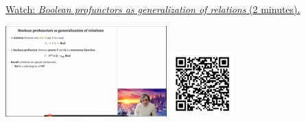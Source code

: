 
\begin{minipage}{10cm}
    \href{https://act4e-spring21.netlify.app/videos/spring2021-profunctors:bool-prof-gen-rel.html}{Watch: \emph{Boolean profunctors as generalization of relations} (2 minutes).}
        
    \href{https://act4e-spring21.netlify.app/videos/spring2021-profunctors:bool-prof-gen-rel.html}{\includegraphics[height=3.5cm]{spring2021-profunctors:bool-prof-gen-rel/thumbnails.jpg}}
    \href{https://act4e-spring21.netlify.app/videos/spring2021-profunctors:bool-prof-gen-rel.html}{\includegraphics[height=2.5cm]{spring2021-profunctors:bool-prof-gen-rel/qrcode.png}}
\end{minipage}
